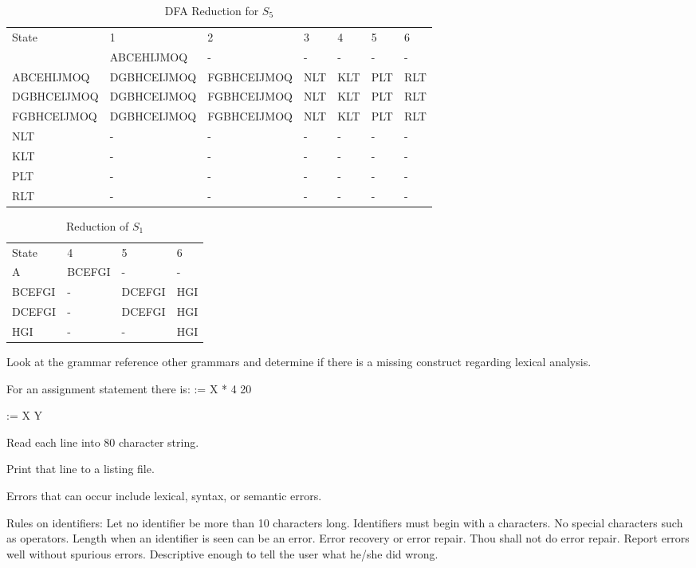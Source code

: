 \begin{table}[htdp]
\caption{DFA Reduction for $S_5$}
\begin{center}
\begin{tabular}{|l|l|l|l|l|l|l|}
State		& 1	&	2&	3&	4&	5&	6 \\
			& ABCEHIJMOQ	& 	-&	-&	-& 	-&	-\\
ABCEHIJMOQ	& DGBHCEIJMOQ & FGBHCEIJMOQ&	NLT&	KLT& 	PLT&	RLT	\\
DGBHCEIJMOQ		& DGBHCEIJMOQ	& FGBHCEIJMOQ&NLT& KLT&PLT&RLT \\
FGBHCEIJMOQ		& DGBHCEIJMOQ	& FGBHCEIJMOQ&NLT& KLT&PLT&RLT \\
NLT		& -	&	-&	-&	-&	-&	- \\
KLT		& -	&	-&	-&	-&	-&	- \\
PLT		& -	&	-&	-&	-&	-&	- \\
RLT		& -	&	-&	-&	-&	-&	- \\

\end{tabular}
\end{center}
\label{default}
\end{table}%

\begin{table}[htdp]
\caption{Reduction of $S_1$}
\begin{center}
\begin{tabular}{|l|l|l|l|}
State	& 4	& 5	& 6	\\
A	& BCEFGI	& -	& -	\\
BCEFGI	& -	& DCEFGI	& HGI	\\
DCEFGI	& -	& DCEFGI	& HGI	\\
HGI	& -	& -	& HGI	\\
\end{tabular}
\end{center}
\label{default}
\end{table}%


Look at the grammar reference other grammars and determine if there is a missing construct regarding lexical analysis.  



For an assignment statement there is:
:= X * 4 20 

:= X Y

Read each line into 80 character string.  

Print that line to a listing file.  

Errors that can occur include lexical, syntax, or semantic errors.  

Rules on identifiers:  Let no identifier be more than 10 characters long.   Identifiers must begin with a characters.  No special characters such as operators.    Length when an identifier is seen can be an error.  Error recovery or error repair.  Thou shall not do error repair.  Report errors well without spurious errors.  Descriptive enough to tell the user what he/she did wrong.   

